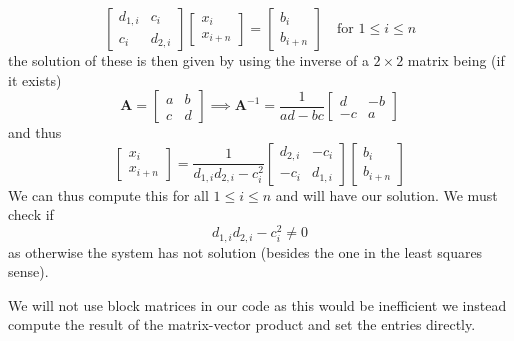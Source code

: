 \documentclass{article}
\begin{document}
\begin{equation*}
    \begin{bmatrix}
        d_{1,i} & c_{i} \\
        c_{i} & d_{2,i}
    \end{bmatrix}\begin{bmatrix}
        x_{i} \\ x_{i + n}
    \end{bmatrix} = \begin{bmatrix}
        b_{i} \\ b_{i + n}
    \end{bmatrix} \quad \text{for } 1 \leq i \leq n
\end{equation*}
the solution of these is then given by using the inverse of a $2 \times 2$ matrix being (if it exists)
\begin{equation*}
    \mathbf{A} = \begin{bmatrix}
        a & b \\
        c & d
    \end{bmatrix} \implies \mathbf{A}^{-1} = \frac{1}{ad - bc} \begin{bmatrix}
        d & -b \\
        -c & a
    \end{bmatrix}
\end{equation*}
and thus
\begin{equation*}
    \begin{bmatrix}
        x_{i} \\
        x_{i + n}
    \end{bmatrix} = \frac{1}{d_{1,i}d_{2,i} - c_{i}^{2}}\begin{bmatrix}
        d_{2,i} & -c_{i} \\
        -c_{i} & d_{1,i}
    \end{bmatrix}\begin{bmatrix}
        b_{i} \\ b_{i + n}
    \end{bmatrix}
\end{equation*}
We can thus compute this for all $1 \leq i \leq n$ and will have our solution. We must check if 
\begin{equation*}
    d_{1,i}d_{2,i} - c_{i}^{2} \neq 0
\end{equation*}
as otherwise the system has not solution (besides the one in the least squares sense).

\pagebreak

\noindent We will not use block matrices in our code as this would be inefficient we instead compute the result of the matrix-vector product and set the entries directly.
\end{document}
